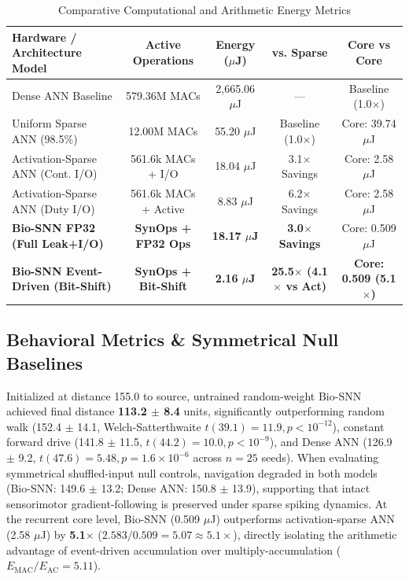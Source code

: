 \documentclass[conference]{IEEEtran}
\begin{document}
\begin{table}[htbp]
\caption{Comparative Computational and Arithmetic Energy Metrics}
\begin{center}
\small
\begin{tabular}{lcccc}
\toprule
\textbf{Hardware / Architecture Model} & \textbf{Active Operations} & \textbf{Energy ($\mu$J)} & \textbf{vs. Sparse} & \textbf{Core vs Core} \\
\midrule
Dense ANN Baseline & 579.36M MACs & 2,665.06 $\mu$J & --- & Baseline (1.0$\times$) \\
Uniform Sparse ANN (98.5\%) & 12.00M MACs & 55.20 $\mu$J & Baseline (1.0$\times$) & Core: 39.74 $\mu$J \\
Activation-Sparse ANN (Cont. I/O) & 561.6k MACs + I/O & 18.04 $\mu$J & 3.1$\times$ Savings & Core: 2.58 $\mu$J \\
Activation-Sparse ANN (Duty I/O) & 561.6k MACs + Active & 8.83 $\mu$J & 6.2$\times$ Savings & Core: 2.58 $\mu$J \\
\textbf{Bio-SNN FP32 (Full Leak+I/O)} & \textbf{SynOps + FP32 Ops} & \textbf{18.17 $\mu$J} & \textbf{3.0$\times$ Savings} & Core: 0.509 $\mu$J \\
\textbf{Bio-SNN Event-Driven (Bit-Shift)} & \textbf{SynOps + Bit-Shift} & \textbf{2.16 $\mu$J} & \textbf{25.5$\times$ (4.1$\times$ vs Act)} & \textbf{Core: 0.509 (5.1$\times$)} \\
\bottomrule
\end{tabular}
\end{center}
\end{table}

\subsection{Behavioral Metrics \& Symmetrical Null Baselines}
Initialized at distance 155.0 to source, untrained random-weight Bio-SNN achieved final distance \textbf{113.2 $\pm$ 8.4} units, significantly outperforming random walk (152.4 $\pm$ 14.1, Welch-Satterthwaite $t(39.1) = 11.9, p < 10^{-12}$), constant forward drive (141.8 $\pm$ 11.5, $t(44.2) = 10.0, p < 10^{-9}$), and Dense ANN (126.9 $\pm$ 9.2, $t(47.6) = 5.48, p = 1.6 \times 10^{-6}$ across $n = 25$ seeds). When evaluating symmetrical shuffled-input null controls, navigation degraded in both models (Bio-SNN: 149.6 $\pm$ 13.2; Dense ANN: 150.8 $\pm$ 13.9), supporting that intact sensorimotor gradient-following is preserved under sparse spiking dynamics. At the recurrent core level, Bio-SNN (0.509 $\mu$J) outperforms activation-sparse ANN (2.58 $\mu$J) by \textbf{5.1$\times$} ($2.583 / 0.509 = 5.07 \approx 5.1\times$), directly isolating the arithmetic advantage of event-driven accumulation over multiply-accumulation ($E_{\text{MAC}} / E_{\text{AC}} = 5.11$).
\end{document}
